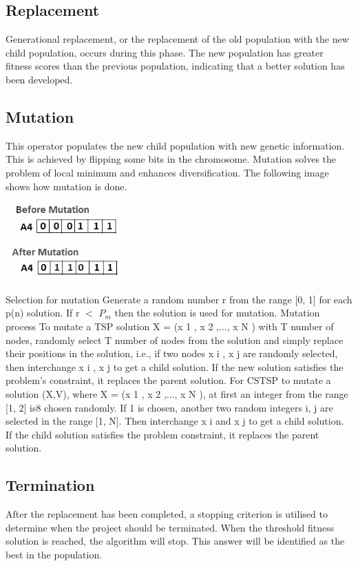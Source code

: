 \documentclass{article}
\begin{document}
\subsection{Replacement}
Generational replacement, or the replacement of the old population with the new child population,
occurs during this phase. The new population has greater fitness scores than the previous population, indicating that
a better solution has been developed.
\subsection{Mutation}
This operator populates the new child population with new genetic information. This is achieved by flipping some
bits in the chromosome. Mutation solves the problem of local minimum and enhances diversification. The following
image shows how mutation is done.
\begin{center}
    \includegraphics[width=4.5cm]{mutation01.png}
\end{center}
Selection for mutation Generate a random number r from the range [0, 1] for each p(n) solution. If r $<$ $P_m$ then the
solution is used for mutation.
Mutation process
To mutate a TSP solution X = (x 1 , x 2 ,..., x N ) with T number of nodes, randomly select T number of nodes from the
solution and simply replace their positions in the solution, i.e., if two nodes x i , x j are randomly selected, then
interchange x i , x j to get a child solution. If the new solution satisfies the problem's constraint, it replaces the parent
solution. For CSTSP to mutate a solution (X,V), where X = (x 1 , x 2 ,..., x N ), at first an integer from the range [1, 2] is8
chosen randomly. If 1 is chosen, another two random integers i, j are selected in the range [1, N]. Then interchange
x i and x j to get a child solution. If the child solution satisfies the problem constraint, it replaces the parent solution.
\subsection{Termination}
After the replacement has been completed, a stopping criterion is utilised to determine when the project should be
terminated. When the threshold fitness solution is reached, the algorithm will stop. This answer will be identified as
the best in the population.
\end{document}
